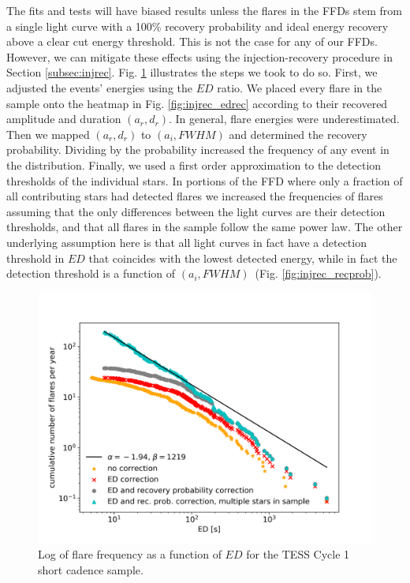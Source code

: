 \documentclass{aastex62}
\begin{document}
The fits and tests will have biased results unless the flares in the FFDs stem from a single light curve with a 100\% recovery probability and ideal energy recovery above a clear cut energy threshold. This is not the case for any of our FFDs. However, we can mitigate these effects using the injection-recovery procedure in Section \ref{subsec:injrec}. Fig. \ref{fig:ffd_all_ed} illustrates the steps we took to do so. First, we adjusted the events' energies using the $ED$ ratio. We placed every flare in the sample onto the heatmap in Fig. \ref{fig:injrec_edrec} according to their recovered amplitude and duration $(a_r,d_r)$. In general, flare energies were underestimated. Then we mapped $(a_r,d_r)$ to $(a_i,FWHM)$ and determined the recovery probability. Dividing by the probability increased the frequency of any event in the distribution. Finally, we used a first order approximation to the detection thresholds of the individual stars. In portions of the FFD where only a fraction of all contributing stars had detected flares we increased the frequencies of flares assuming that the only differences between the light curves are their detection thresholds, and that all flares in the sample follow  the same power law. The other underlying assumption here is that all light curves in fact have a detection threshold in $ED$ that coincides with the lowest detected energy, while in fact the detection threshold is a function of $(a_i,FWHM)$~(Fig. \ref{fig:injrec_recprob}).
%
%

\begin{figure}
	\includegraphics[width=0.5\columnwidth]{12_03_2020_13_03_full_sample_ffd.png}
    \caption{Log of flare frequency as a function of $ED$ for the TESS Cycle 1 short cadence sample.}
    \label{fig:ffd_all_ed}
\end{figure}
\end{document}
